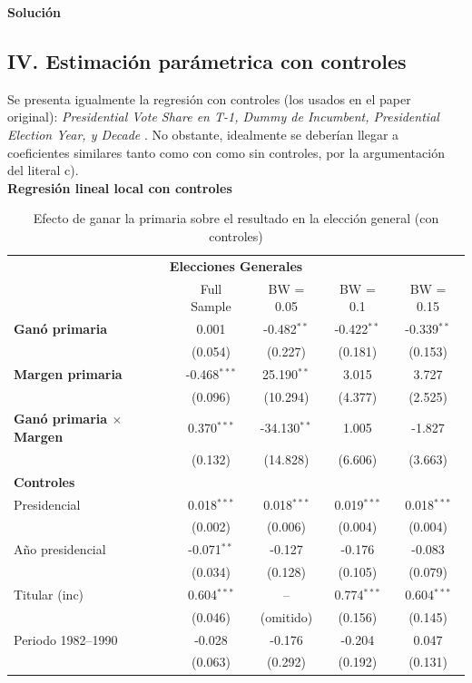 \documentclass[a4paper, answers, addpoints, 11pt]{exam}
\newenvironment{solucion}{%
  \begin{mdframed}[
    backgroundcolor=blue!5,    %
    linecolor=blue!50,          %
    linewidth=2pt,              %
    leftmargin=10pt,            %
    rightmargin=8pt,           %
    topline=true,              %
    bottomline=true,            %
    roundcorner=10pt,           %
    innerleftmargin=10pt,       %
    innerrightmargin=10pt,      %
    innerbottommargin=10pt,     %
    innertopmargin=10pt         %
  ]%
  \begin{tcolorbox}[colframe=blue!50!black, colback=blue!50, coltitle=white, sharp corners=all, boxrule=1mm, width=\textwidth, halign=left, valign=center, top=0mm, bottom=0mm, left=0mm, right=0mm] \textbf{Solución} \end{tcolorbox} }{\end{mdframed}}
\begin{document}
\begin{enumerate}[resume]
\begin{enumerate}
\begin{solucion}
\subsection*{IV. Estimación parámetrica con controles}
Se presenta igualmente la regresión con controles (los usados en el paper original): \textit{
 Presidential Vote Share en T-1, Dummy de Incumbent, Presidential Election Year, y
Decade
 }. No obstante, idealmente se deberían llegar a coeficientes similares tanto como con como sin controles, por la argumentación del literal c). \\
 
\textbf{Regresión lineal local con controles}

\begin{table}[H]\centering
\caption{Efecto de ganar la primaria sobre el resultado en la elección general (con controles)}
\label{tab:rd_controls_full}
\footnotesize
\begin{tabular}{lcccc}
\toprule
 \multicolumn{5}{c}{\textbf{Elecciones Generales}} \\
\cmidrule(lr){2-5}
& Full Sample & BW = 0.05 & BW = 0.1 & BW = 0.15 \\
\midrule
\textbf{Ganó primaria} & 0.001 & -0.482$^{**}$ & -0.422$^{**}$ & -0.339$^{**}$ \\
 & (0.054) & (0.227) & (0.181) & (0.153) \\
\textbf{Margen primaria} & -0.468$^{***}$ & 25.190$^{**}$ & 3.015 & 3.727 \\
 & (0.096) & (10.294) & (4.377) & (2.525) \\
\textbf{Ganó primaria $\times$ Margen} & 0.370$^{***}$ & -34.130$^{**}$ & 1.005 & -1.827 \\
 & (0.132) & (14.828) & (6.606) & (3.663) \\
\midrule
\textbf{Controles} \\
Presidencial & 0.018$^{***}$ & 0.018$^{***}$ & 0.019$^{***}$ & 0.018$^{***}$ \\
 & (0.002) & (0.006) & (0.004) & (0.004) \\
Año presidencial & -0.071$^{**}$ & -0.127 & -0.176 & -0.083 \\
 & (0.034) & (0.128) & (0.105) & (0.079) \\
Titular (inc) & 0.604$^{***}$ & -- & 0.774$^{***}$ & 0.604$^{***}$ \\
 & (0.046) & (omitido) & (0.156) & (0.145) \\
Periodo 1982--1990 & -0.028 & -0.176 & -0.204 & 0.047 \\
 & (0.063) & (0.292) & (0.192) & (0.131) \\

\end{tabular}
\end{table}
\end{solucion}
\end{enumerate}
\end{enumerate}
\end{document}
